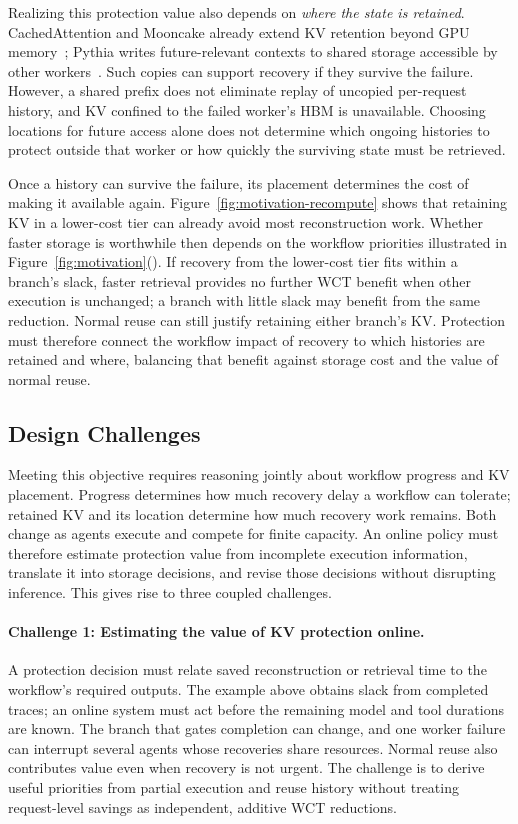 Realizing this protection value also depends on \emph{where the state is
retained}.
CachedAttention and Mooncake already extend KV retention beyond GPU
memory~\cite{gao2024cachedattention,qin2025mooncake}; Pythia writes
future-relevant contexts to shared storage accessible by other
workers~\cite{yu2026pythia}. Such copies can support recovery if they survive
the failure. However, a shared prefix does not eliminate replay of
uncopied per-request history, and KV confined to the failed worker's HBM is
unavailable. Choosing locations for future access alone does not determine
which ongoing histories to protect outside that worker or how quickly
the surviving state must be retrieved.

\label{sec:motivation-long-context}
Once a history can survive the failure, its placement determines the
cost of making it available again. Figure~\ref{fig:motivation-recompute}
shows that retaining KV in a lower-cost tier can already avoid most
reconstruction work. Whether faster storage is worthwhile then depends
on the workflow priorities illustrated in
Figure~\ref{fig:motivation}().
If recovery from the lower-cost tier fits within a branch's slack,
faster retrieval provides no further WCT benefit when other execution is
unchanged; a branch with little slack may benefit from the same reduction.
Normal reuse can still justify retaining either branch's KV.
Protection must therefore connect the workflow impact of recovery to
which histories are retained and where, balancing that benefit against
storage cost and the value of normal reuse.

\subsection{Design Challenges}
\label{sec:motivation-challenges}

Meeting this objective requires reasoning jointly about workflow progress
and KV placement. Progress determines how much recovery delay a workflow
can tolerate; retained KV and its location determine how much recovery
work remains. Both change as agents execute and compete for finite
capacity. An online policy must therefore estimate protection value from
incomplete execution information, translate it into storage decisions,
and revise those decisions without disrupting inference.
This gives rise to three coupled challenges.

\paragraph{Challenge 1: Estimating the value of KV protection online.}
A protection decision must relate saved reconstruction or retrieval time
to the workflow's required outputs. The example above obtains slack from
completed traces; an online system must act before the remaining model
and tool durations are known. The branch that gates completion can
change, and one worker failure can interrupt several agents whose
recoveries share resources. Normal reuse also contributes value even
when recovery is not urgent. The challenge is to derive useful priorities
from partial execution and reuse history without treating request-level
savings as independent, additive WCT reductions.

